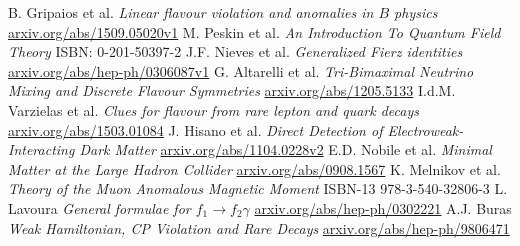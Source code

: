 \documentclass[11pt,a4paper,twoside]{article}
\numberwithin{equation}{section}
\begin{document}
\newpage

\begin{thebibliography}{xxx}
 B. Gripaios et al. \textit{Linear flavour violation and anomalies in $B$ physics} \href{http://arxiv.org/abs/1509.05020v1}{arxiv.org/abs/1509.05020v1}
 M. Peskin et al. \textit{An Introduction To Quantum Field Theory} ISBN: 0-201-50397-2
 J.F. Nieves et al. \textit{Generalized Fierz identities} \href{http://http://arxiv.org/abs/hep-ph/0306087v1}{arxiv.org/abs/hep-ph/0306087v1}
 G. Altarelli et al. \textit{Tri-Bimaximal Neutrino Mixing and Discrete Flavour Symmetries} \href{https://arxiv.org/abs/1205.5133}{arxiv.org/abs/1205.5133}
 I.d.M. Varzielas et al. \textit{Clues for flavour from rare lepton and quark decays} \href{https://arxiv.org/abs/1503.01084}{arxiv.org/abs/1503.01084}
 J. Hisano et al. \textit{Direct Detection of Electroweak-Interacting Dark Matter} \href{https://arxiv.org/abs/1104.0228v2}{arxiv.org/abs/1104.0228v2}
 E.D. Nobile et al. \textit{Minimal Matter at the Large Hadron Collider} \href{http://arxiv.org/abs/0908.1567}{arxiv.org/abs/0908.1567}
 K. Melnikov et al. \textit{Theory of the Muon Anomalous Magnetic Moment} ISBN-13 978-3-540-32806-3
 L. Lavoura \textit{General formulae for $f_1\rightarrow f_2 \gamma$} \href{http://arxiv.org/abs/hep-ph/0302221}{arxiv.org/abs/hep-ph/0302221}
 A.J. Buras \textit{Weak Hamiltonian, CP Violation and Rare Decays} \href{http://arxiv.org/abs/hep-ph/9806471}{arxiv.org/abs/hep-ph/9806471}
\end{thebibliography}
\end{document}

